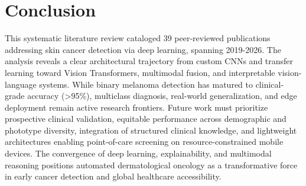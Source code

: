 \documentclass[conference]{IEEEtran}
\begin{document}
\section{Conclusion}

This systematic literature review cataloged 39 peer-reviewed publications addressing skin cancer detection via deep learning, spanning 2019-2026. The analysis reveals a clear architectural trajectory from custom CNNs and transfer learning toward Vision Transformers, multimodal fusion, and interpretable vision-language systems. While binary melanoma detection has matured to clinical-grade accuracy (>95\%), multiclass diagnosis, real-world generalization, and edge deployment remain active research frontiers. Future work must prioritize prospective clinical validation, equitable performance across demographic and phototype diversity, integration of structured clinical knowledge, and lightweight architectures enabling point-of-care screening on resource-constrained mobile devices. The convergence of deep learning, explainability, and multimodal reasoning positions automated dermatological oncology as a transformative force in early cancer detection and global healthcare accessibility.



\end{document}

